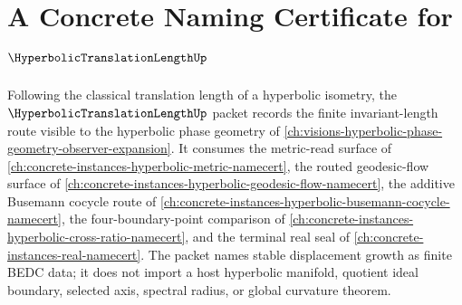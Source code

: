 \chapter{A Concrete Naming Certificate for $\HyperbolicTranslationLengthUp$}
\label{ch:concrete-instances-hyperbolic-translation-length-namecert}

Following the classical translation length of a hyperbolic isometry, the $\HyperbolicTranslationLengthUp$ packet records the finite invariant-length route visible to the hyperbolic phase geometry of \autoref{ch:visions-hyperbolic-phase-geometry-observer-expansion}. It consumes the metric-read surface of \autoref{ch:concrete-instances-hyperbolic-metric-namecert}, the routed geodesic-flow surface of \autoref{ch:concrete-instances-hyperbolic-geodesic-flow-namecert}, the additive Busemann cocycle route of \autoref{ch:concrete-instances-hyperbolic-busemann-cocycle-namecert}, the four-boundary-point comparison of \autoref{ch:concrete-instances-hyperbolic-cross-ratio-namecert}, and the terminal real seal of \autoref{ch:concrete-instances-real-namecert}. The packet names stable displacement growth as finite BEDC data; it does not import a host hyperbolic manifold, quotient ideal boundary, selected axis, spectral radius, or global curvature theorem.


